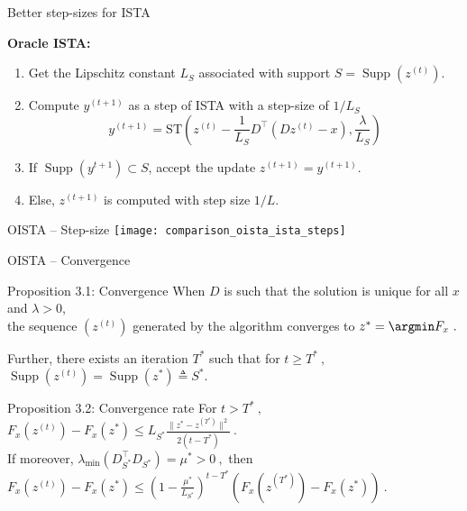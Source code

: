 \documentclass{beamer}
\DeclareMathOperator*{\supp}{Supp}
\begin{document}
\begin{frame}{Better step-sizes for ISTA}

    {\bf \large Oracle ISTA:\\[1em]}
    \begin{enumerate}\itemsep1em
        \item Get the Lipschitz constant $L_S$ associated with support $S = \supp(z^{(t)})$.
        \item Compute $y^{(t+1)}$ as a step of ISTA with a step-size of $1/L_S$
        \[
        y^{(t+1)} = \text{ST}\left(z^{(t)}
        - \frac{1}{L_S}D^\top(D z^{(t)} - x),
        \frac{\lambda}{L_S}\right)
        \]
        \item If $\supp(y^{t+1}) \subset S$, accept the update $z^{(t+1)} = y^{(t+1)}$.
        \item Else, $z^{(t+1)}$ is computed with step size $1/L$.
    \end{enumerate}
\end{frame}


\begin{frame}{OISTA -- Step-size}
\centering
\texttt{[image: comparison\_oista\_ista\_steps]}\\
\end{frame}

\begin{frame}{OISTA -- Convergence}
    \begin{block}{Proposition 3.1: Convergence}
        When $D$ is such that the solution is unique for all $x$ and $\lambda >0$,\\
        the sequence $(z^{(t)})$ generated by the algorithm converges to $z^* =\argmin F_x~.$
        
        Further, there exists an iteration $T^*$ such that for $t\geq T^*~,$ $\supp(z^{(t)}) = \supp(z^*) \triangleq S^*$.
    \end{block}

    \begin{block}{Proposition 3.2: Convergence rate}
        For $t > T^*~,$\\
        {\centering
            $F_x(z^{(t)}) - F_x(z^*) \leq L_{S^*} \frac{\|z^{*} - z^{(T^*)}\|^2}{2(t - T^*)}~.$\\[1em]
        }
        If moreover, $\lambda_{\min}(D_{S^*}^\top D_{S^*}) = \mu^* > 0~,$ then\\[1em]
        {\centering 
            $F_x(z^{(t)}) - F_x(z^*) \leq
                (1 - \tfrac{\mu^*}{L_{S^*}})^{t - T^*}(F_x(z^{(T^*)}) - F_x(z^*))~.$\\
        }
    \end{block}
\end{frame}
\end{document}
